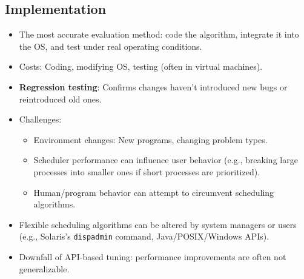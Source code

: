 \subsection{Implementation}
\begin{itemize}
    \item The most accurate evaluation method: code the algorithm, integrate it into the OS, and test under real operating conditions.
    \item Costs: Coding, modifying OS, testing (often in virtual machines).
    \item \textbf{Regression testing}: Confirms changes haven't introduced new bugs or reintroduced old ones.
    \item Challenges:
        \begin{itemize}
            \item Environment changes: New programs, changing problem types.
            \item Scheduler performance can influence user behavior (e.g., breaking large processes into smaller ones if short processes are prioritized).
            \item Human/program behavior can attempt to circumvent scheduling algorithms.
        \end{itemize}
    \item Flexible scheduling algorithms can be altered by system managers or users (e.g., Solaris's \texttt{dispadmin} command, Java/POSIX/Windows APIs).
    \item Downfall of API-based tuning: performance improvements are often not generalizable.
\end{itemize}

